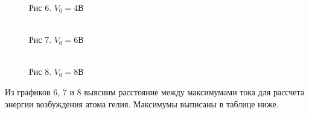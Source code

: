 \documentclass[12pt]{article}
\begin{document}
\begin{figure}[h]
\begin{minipage}[h]{0.47\linewidth}
\begin{minipage}[h]{1\linewidth}
        Рис 6. $V_0 = 4 В$
      \end{minipage}
      \vfill
      \begin{minipage}[h]{1\linewidth}
         \\
        Рис 7. $V_0 = 6 В$
      \end{minipage}
      \vfill
      \begin{minipage}[h]{1\linewidth}
         \\
        Рис 8. $V_0 = 8 В$
      \end{minipage}
    \end{minipage}
    \label {fig:image3}
  \end{figure}

  Из графиков 6, 7 и 8 выясним расстояние между максимумами тока для рассчета энергии возбуждения атома гелия.
  Максимумы выписаны в таблице ниже.

  \begin{figure}[h!]
  \end{figure}
\end{document}
